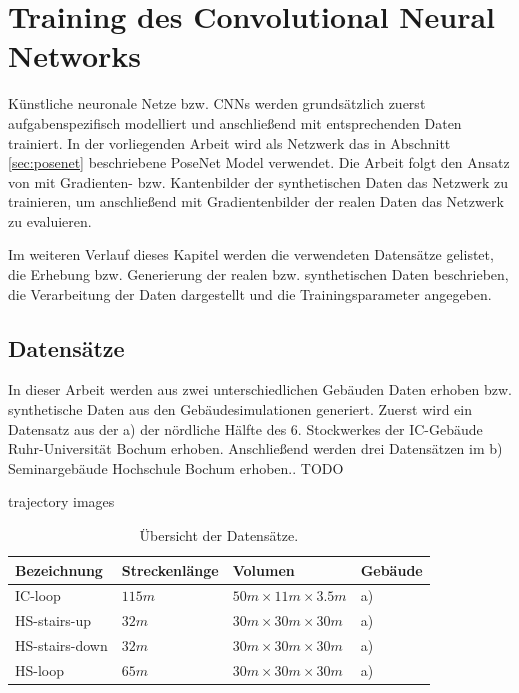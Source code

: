 
\section{Training des Convolutional Neural Networks}
Künstliche neuronale Netze bzw. CNNs werden grundsätzlich zuerst aufgabenspezifisch modelliert und anschließend mit entsprechenden Daten trainiert.  In der vorliegenden Arbeit wird als Netzwerk das in Abschnitt \ref{sec:posenet} beschriebene PoseNet Model verwendet. Die Arbeit folgt den Ansatz von \citet{acharyaBIMPoseNetIndoorCamera2019} mit Gradienten- bzw. Kantenbilder der synthetischen Daten das Netzwerk zu trainieren, um anschließend mit Gradientenbilder der realen Daten das Netzwerk zu evaluieren. 

Im weiteren Verlauf dieses Kapitel werden die verwendeten Datensätze gelistet, die Erhebung bzw. Generierung der realen bzw. synthetischen Daten beschrieben, die Verarbeitung der Daten dargestellt und die Trainingsparameter angegeben. 


\subsection{Datensätze}
\label{subsec:datasets}
In dieser Arbeit werden aus zwei unterschiedlichen Gebäuden Daten erhoben bzw. synthetische Daten aus den Gebäudesimulationen generiert. 
Zuerst wird ein Datensatz aus der a) der nördliche Hälfte des 6. Stockwerkes der IC-Gebäude Ruhr-Universität Bochum erhoben. Anschließend werden drei Datensätzen im b) Seminargebäude Hochschule Bochum erhoben..
TODO

trajectory images


\begin{table}[H]
	\centering
	\caption{Übersicht der Datensätze.}
	\begin{tabularx}{1.0\textwidth}{X X X >{\centering\arraybackslash}p{1.7cm} }
		\textbf{Bezeichnung} & \textbf{Streckenlänge} & \textbf{Volumen} & \textbf{Gebäude}\\
		\hline
		IC-loop & $115m$ & $50m \times 11m \times 3.5m$ & a) \\
		\hline
		HS-stairs-up & $32m$ & $30m \times 30m \times 30m$ & a)\\
		\hline
		HS-stairs-down & $32m$ & $30m \times 30m \times 30m$ & a)\\
		\hline
		HS-loop & $65m$ & $30m \times 30m \times 30m$ & a)\\
	\end{tabularx}
	\label{tab:dataset_metrics}
\end{table}

